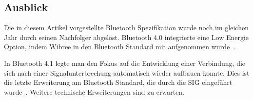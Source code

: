 \begin{multicols}{3}
\subsection*{Ausblick}
Die in diesem Artikel vorgestellte Bluetooth Spezifikation wurde noch im gleichen Jahr durch seinen Nachfolger abgelöst. Bluetooth 4.0 integrierte eine Low Energie Option, indem Wibree in den Bluetooth Standard mit aufgenommen wurde~\cite{bluetooth3.0.1}. 

In Bluetooth 4.1 legte man den Fokus auf die Entwicklung einer Verbindung, die sich nach einer Signalunterbrechung automatisch wieder aufbauen konnte. Dies ist die letzte Erweiterung am Bluetooth Standard, die durch die SIG eingeführt wurde~\cite{bluetooth3.0.1}. Weitere technische Erweiterungen sind zu erwarten. 

\printbibliography[segment=4,heading=subbibliography]

\end{multicols}
\newpage